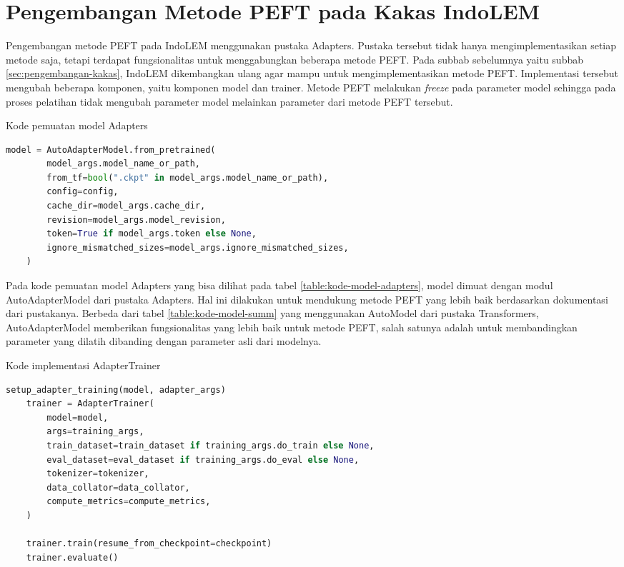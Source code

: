\section{Pengembangan Metode PEFT pada Kakas IndoLEM}

Pengembangan metode PEFT pada IndoLEM menggunakan pustaka Adapters. Pustaka tersebut tidak hanya mengimplementasikan setiap metode saja, tetapi terdapat fungsionalitas untuk menggabungkan beberapa metode PEFT. Pada subbab sebelumnya yaitu subbab \ref{sec:pengembangan-kakas}, IndoLEM dikembangkan ulang agar mampu untuk mengimplementasikan metode PEFT. Implementasi tersebut  mengubah beberapa komponen, yaitu komponen model dan trainer. Metode PEFT  melakukan \textit{freeze} pada parameter model sehingga pada proses pelatihan tidak  mengubah parameter model melainkan parameter dari metode PEFT tersebut.

\begin{table}[h]
    \caption{Kode pemuatan model Adapters}
    \label{table:kode-model-adapters}
    \begin{lstlisting}[language=python]
    model = AutoAdapterModel.from_pretrained(
        model_args.model_name_or_path,
        from_tf=bool(".ckpt" in model_args.model_name_or_path),
        config=config,
        cache_dir=model_args.cache_dir,
        revision=model_args.model_revision,
        token=True if model_args.token else None,
        ignore_mismatched_sizes=model_args.ignore_mismatched_sizes,
    )
    \end{lstlisting}
\end{table}

Pada kode pemuatan model Adapters yang bisa dilihat pada tabel \ref{table:kode-model-adapters}, model dimuat dengan modul AutoAdapterModel dari pustaka Adapters. Hal ini dilakukan untuk mendukung metode PEFT yang lebih baik berdasarkan dokumentasi dari pustakanya. Berbeda dari tabel \ref{table:kode-model-summ} yang menggunakan AutoModel dari pustaka Transformers, AutoAdapterModel memberikan fungsionalitas yang lebih baik untuk metode PEFT, salah satunya adalah untuk membandingkan parameter yang  dilatih dibanding dengan parameter asli dari modelnya.

\begin{table}[h]
    \caption{Kode implementasi AdapterTrainer}
    \label{table:kode-adaptertrainer}
    \begin{lstlisting}[language=python]
    setup_adapter_training(model, adapter_args)
    trainer = AdapterTrainer(
        model=model,
        args=training_args,
        train_dataset=train_dataset if training_args.do_train else None,
        eval_dataset=eval_dataset if training_args.do_eval else None,
        tokenizer=tokenizer,
        data_collator=data_collator,
        compute_metrics=compute_metrics,
    )

    trainer.train(resume_from_checkpoint=checkpoint)
    trainer.evaluate()
    \end{lstlisting}
\end{table}

